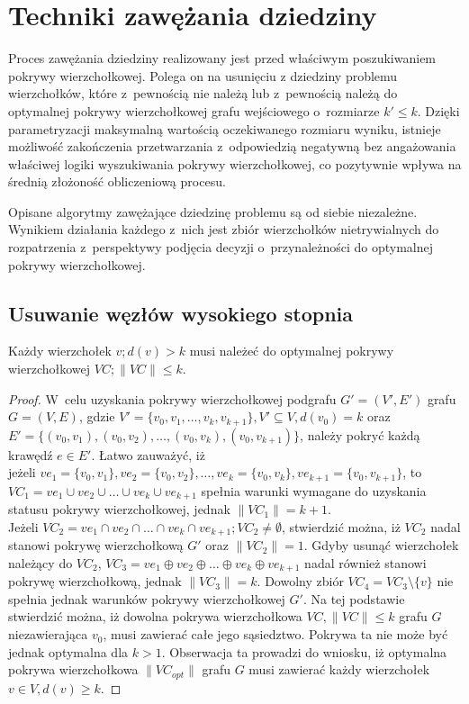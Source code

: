 \section{Techniki zawężania dziedziny}\label{Section_kernelization}

Proces zawężania dziedziny realizowany jest przed właściwym poszukiwaniem
pokrywy wierzchołkowej. Polega on na usunięciu z dziedziny problemu
wierzchołków, które z~pewnością nie należą lub z~pewnością należą do optymalnej
pokrywy wierzchołkowej grafu wejściowego o~rozmiarze $k\prime \leq k$.
Dzięki parametryzacji maksymalną wartością oczekiwanego rozmiaru wyniku,
istnieje możliwość zakończenia przetwarzania z~odpowiedzią negatywną bez
angażowania właściwej logiki wyszukiwania pokrywy wierzchołkowej, co pozytywnie
wpływa na średnią złożoność obliczeniową procesu.

Opisane algorytmy zawężające dziedzinę problemu są od siebie niezależne.
Wynikiem działania każdego z~nich jest zbiór wierzchołków nietrywialnych do
rozpatrzenia z~perspektywy podjęcia decyzji o~przynależności do optymalnej
pokrywy wierzchołkowej.

\subsection{Usuwanie węzłów wysokiego stopnia}\label{section_kernelization_high-degree}

\begin{theorem}
  Każdy wierzchołek $v; d(v) > k $ musi należeć do optymalnej pokrywy wierzchołkowej 
  $VC; \|VC\| \leq k$.
\end{theorem}
\begin{proof}
  W~celu uzyskania pokrywy wierzchołkowej podgrafu $G\prime=(V\prime,E\prime)$
  grafu $G=(V,E)$, gdzie $V\prime=\{v_0, v_1, \ldots, v_k, v_{k+1}\}, V\prime
  \subseteq V, d(v_0)=k$ oraz \\
  $E\prime=\{(v_0,v_1), (v_0,v_2), \ldots, (v_0, v_k), (v_0,v_{k+1})\}$,
  należy pokryć każdą krawędź $e \in E\prime$.
  Łatwo zauważyć, iż \\ jeżeli $ve_1=\{v_0,v_1\}, ve_2=\{v_0,v_2\}, \ldots,
  ve_k=\{v_0,v_k\},ve_{k+1}=\{v_0,v_{k+1}\}$,
  to ${VC_1=ve_1 \cup ve_2 \cup \ldots \cup ve_k \cup ve_{k+1}}$ spełnia warunki 
  wymagane do uzyskania statusu pokrywy wierzchołkowej, jednak $\|VC_1\| = k +1$.\\
  Jeżeli $VC_2=ve_1 \cap ve_2 \cap \ldots \cap ve_k \cap ve_{k+1}; VC_2 \neq \emptyset$,
  stwierdzić można, iż $VC_2$ nadal stanowi pokrywę wierzchołkową $G\prime$ oraz
  $\|VC_2\|=1$.
  Gdyby usunąć wierzchołek należący do $VC_2$, $VC_3=ve_1 \oplus ve_2 \oplus \ldots \oplus ve_k \oplus ve_{k+1}$ nadal
  również stanowi pokrywę wierzchołkową, jednak $\|VC_3\|=k$.
  Dowolny zbiór $VC_4=VC_3 \setminus \{v\}$ nie spełnia jednak warunków pokrywy
  wierzchołkowej $G\prime$.
  Na tej podstawie stwierdzić można, iż dowolna pokrywa wierzchołkowa 
  $VC, \|VC\| \leq k$ grafu $G$ niezawierająca $v_0$, musi zawierać całe jego
  sąsiedztwo. Pokrywa ta nie może być jednak optymalna dla $k > 1$.
  Obserwacja ta prowadzi do wniosku, iż optymalna pokrywa wierzchołkowa
  $\|VC_{opt}\|$ grafu $G$ musi zawierać każdy wierzchołek $v \in V, d(v) \geq k$.
\end{proof}

